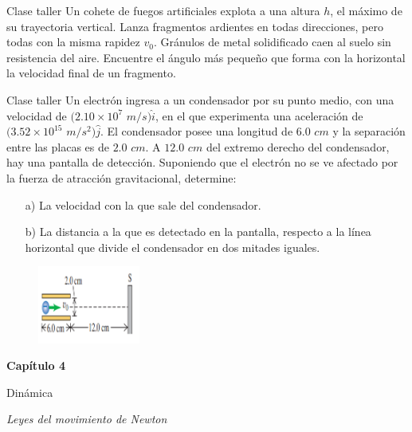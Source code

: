 \begin{frame}{Clase taller}
    Un cohete de fuegos artificiales explota a una altura $h$, el máximo de su trayectoria vertical. Lanza fragmentos ardientes en
todas direcciones, pero todas con la misma rapidez $v_0$. Gránulos
de metal solidificado caen al suelo sin resistencia del aire. Encuentre el ángulo más pequeño que forma con la horizontal
la velocidad final de un fragmento.
\end{frame}

\begin{frame}{Clase taller}
    Un electrón ingresa a un condensador por su punto medio, con una velocidad de $(2.10\times10^{7}$ $m/s)\hat{i}$, en el que experimenta una aceleración de $(3.52\times10^{15}$ $m/s^2)\hat{j}$. El condensador posee una longitud de $6.0$ $cm$ y la separación entre las placas es de $2.0$ $cm$. A $12.0$ $cm$ del extremo derecho del condensador, hay una pantalla de detección. Suponiendo que el electrón no se ve afectado por la fuerza de atracción gravitacional, determine:
	    
	    \begin{itemize}
	        \item[a)] La velocidad con la que sale del condensador.
	        \item[b)] La distancia a la que es detectado en la pantalla, respecto a la línea horizontal que divide el condensador en dos mitades iguales.
	    \end{itemize}
        \begin{figure}[H]
  \centering
    \includegraphics[width=0.3\textwidth]{figures/E.png}
\end{figure}
\end{frame}

\begin{frame}
\begin{center}
    \Huge \textbf{Capítulo 4}
    
    \LARGE Dinámica

    \textit{Leyes del movimiento de Newton}
\end{center}
    
\end{frame}

